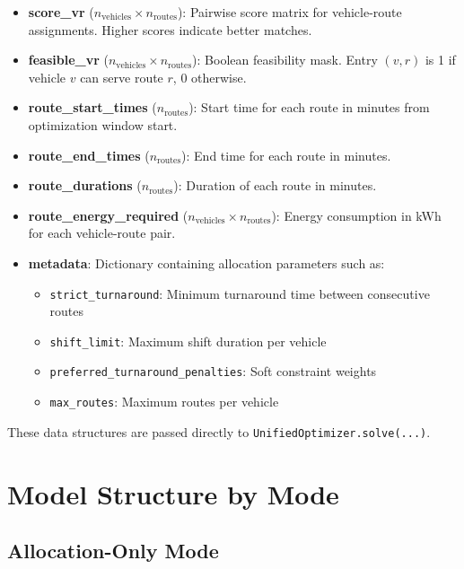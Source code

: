 \documentclass[11pt,a4paper]{article}
\begin{document}
\begin{itemize}
    \item \textbf{score\_vr} ($n_{\text{vehicles}} \times n_{\text{routes}}$): Pairwise score matrix for vehicle-route assignments. Higher scores indicate better matches.
    
    \item \textbf{feasible\_vr} ($n_{\text{vehicles}} \times n_{\text{routes}}$): Boolean feasibility mask. Entry $(v,r)$ is 1 if vehicle $v$ can serve route $r$, 0 otherwise.
    
    \item \textbf{route\_start\_times} ($n_{\text{routes}}$): Start time for each route in minutes from optimization window start.
    
    \item \textbf{route\_end\_times} ($n_{\text{routes}}$): End time for each route in minutes.
    
    \item \textbf{route\_durations} ($n_{\text{routes}}$): Duration of each route in minutes.
    
    \item \textbf{route\_energy\_required} ($n_{\text{vehicles}} \times n_{\text{routes}}$): Energy consumption in kWh for each vehicle-route pair.
    
    \item \textbf{metadata}: Dictionary containing allocation parameters such as:
    \begin{itemize}
        \item \texttt{strict\_turnaround}: Minimum turnaround time between consecutive routes
        \item \texttt{shift\_limit}: Maximum shift duration per vehicle
        \item \texttt{preferred\_turnaround\_penalties}: Soft constraint weights
        \item \texttt{max\_routes}: Maximum routes per vehicle
    \end{itemize}
\end{itemize}

These data structures are passed directly to \texttt{UnifiedOptimizer.solve(...)}.

\section{Model Structure by Mode}

\subsection{Allocation-Only Mode}
\end{document}
